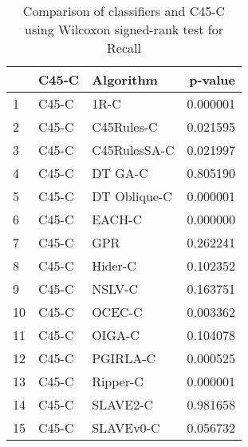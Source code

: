 \begin{table}
\footnotesize
\caption{Comparison of classifiers and C45-C using Wilcoxon signed-rank test for Recall}
\label{tab:C45-C wilcoxon Recall comparison}
\begin{tabular}{lllr}
\hline
 & C45-C & Algorithm & p-value \\
\hline
1 & C45-C & 1R-C & 0.000001 \\
2 & C45-C & C45Rules-C & 0.021595 \\
3 & C45-C & C45RulesSA-C & 0.021997 \\
4 & C45-C & DT GA-C & 0.805190 \\
5 & C45-C & DT Oblique-C & 0.000001 \\
6 & C45-C & EACH-C & 0.000000 \\
7 & C45-C & GPR & 0.262241 \\
8 & C45-C & Hider-C & 0.102352 \\
9 & C45-C & NSLV-C & 0.163751 \\
10 & C45-C & OCEC-C & 0.003362 \\
11 & C45-C & OIGA-C & 0.104078 \\
12 & C45-C & PGIRLA-C & 0.000525 \\
13 & C45-C & Ripper-C & 0.000001 \\
14 & C45-C & SLAVE2-C & 0.981658 \\
15 & C45-C & SLAVEv0-C & 0.056732 \\
\hline
\end{tabular}
\end{table}
